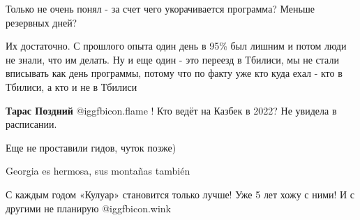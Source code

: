 \begin{itemize}
Только не очень понял - за счет чего укорачивается программа? Меньше резервных дней?


Их достаточно. С прошлого опыта один день в 95\% был лишним и потом люди не
знали, что им делать. Ну и еще один - это переезд в Тбилиси, мы не стали
вписывать как день программы, потому что по факту уже кто куда ехал - кто в
Тбилиси, а кто и не в Тбилиси


\textbf{Тарас Поздний}  @igg{fbicon.flame} ! Кто ведёт на Казбек в 2022? Не увидела в расписании.


Еще не проставили гидов, чуток позже)

Georgia es hermosa, sus montañas también

С каждым годом «Кулуар» становится только лучше! Уже 5 лет хожу с ними! И с другими не планирую @igg{fbicon.wink} 

\end{itemize} %
